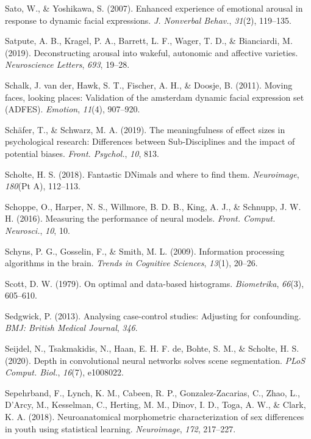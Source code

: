 \documentclass[11pt,american,a4paper,oneside,]{memoir} %
\begin{document}
\leavevmode\hypertarget{ref-Sato2007-ah}{}%
Sato, W., \& Yoshikawa, S. (2007). Enhanced experience of emotional arousal in response to dynamic facial expressions. \emph{J. Nonverbal Behav.}, \emph{31}(2), 119--135.

\leavevmode\hypertarget{ref-satpute2019deconstructing}{}%
Satpute, A. B., Kragel, P. A., Barrett, L. F., Wager, T. D., \& Bianciardi, M. (2019). Deconstructing arousal into wakeful, autonomic and affective varieties. \emph{Neuroscience Letters}, \emph{693}, 19--28.

\leavevmode\hypertarget{ref-Van_der_Schalk2011-bq}{}%
Schalk, J. van der, Hawk, S. T., Fischer, A. H., \& Doosje, B. (2011). Moving faces, looking places: Validation of the amsterdam dynamic facial expression set (ADFES). \emph{Emotion}, \emph{11}(4), 907--920.

\leavevmode\hypertarget{ref-Schafer2019-ue}{}%
Schäfer, T., \& Schwarz, M. A. (2019). The meaningfulness of effect sizes in psychological research: Differences between Sub-Disciplines and the impact of potential biases. \emph{Front. Psychol.}, \emph{10}, 813.

\leavevmode\hypertarget{ref-Scholte2018-he}{}%
Scholte, H. S. (2018). Fantastic DNimals and where to find them. \emph{Neuroimage}, \emph{180}(Pt A), 112--113.

\leavevmode\hypertarget{ref-Schoppe2016-bu}{}%
Schoppe, O., Harper, N. S., Willmore, B. D. B., King, A. J., \& Schnupp, J. W. H. (2016). Measuring the performance of neural models. \emph{Front. Comput. Neurosci.}, \emph{10}, 10.

\leavevmode\hypertarget{ref-schyns2009information}{}%
Schyns, P. G., Gosselin, F., \& Smith, M. L. (2009). Information processing algorithms in the brain. \emph{Trends in Cognitive Sciences}, \emph{13}(1), 20--26.

\leavevmode\hypertarget{ref-scott1979optimal}{}%
Scott, D. W. (1979). On optimal and data-based histograms. \emph{Biometrika}, \emph{66}(3), 605--610.

\leavevmode\hypertarget{ref-Sedgwick2013-op}{}%
Sedgwick, P. (2013). Analysing case-control studies: Adjusting for confounding. \emph{BMJ: British Medical Journal}, \emph{346}.

\leavevmode\hypertarget{ref-Seijdel2020-ff}{}%
Seijdel, N., Tsakmakidis, N., Haan, E. H. F. de, Bohte, S. M., \& Scholte, H. S. (2020). Depth in convolutional neural networks solves scene segmentation. \emph{PLoS Comput. Biol.}, \emph{16}(7), e1008022.

\leavevmode\hypertarget{ref-Sepehrband2018-dy}{}%
Sepehrband, F., Lynch, K. M., Cabeen, R. P., Gonzalez-Zacarias, C., Zhao, L., D'Arcy, M., Kesselman, C., Herting, M. M., Dinov, I. D., Toga, A. W., \& Clark, K. A. (2018). Neuroanatomical morphometric characterization of sex differences in youth using statistical learning. \emph{Neuroimage}, \emph{172}, 217--227.
\end{document}
